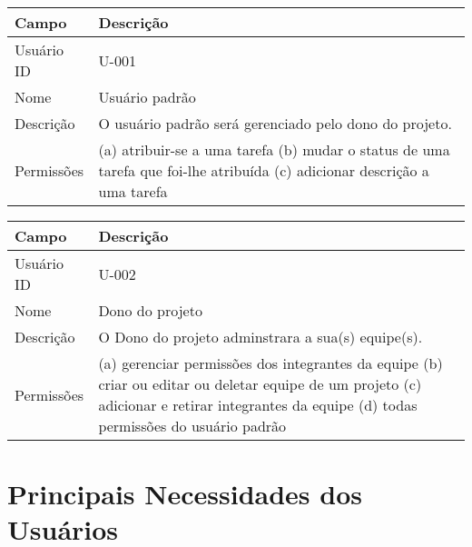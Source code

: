 \begin{table}[htbp]
\begin{tabularx}{\textwidth}{| l | X |}
\hline
Campo             & Descrição                                                                                                                                                                           \\ \hline
Usuário ID    & U-001                                                                                                                                                                              \\ \hline
Nome              & Usuário padrão                                                                                                                                                                       \\ \hline
Descrição         & O usuário padrão será gerenciado pelo dono do projeto.                                                                                                  \\ \hline
Permissões & (a) atribuir-se a uma tarefa (b) mudar o status de uma tarefa que foi-lhe atribuída (c) adicionar descrição a uma tarefa 
\\ \hline
\end{tabularx}
\end{table}



\begin{table}[htbp]
\begin{tabularx}{\textwidth}{| l | X |}
\hline
Campo             & Descrição                                                                                                                                                                           \\ \hline
Usuário ID    & U-002                                                                                                                                                                              \\ \hline
Nome              & Dono do projeto                                                                                                                                                                       \\ \hline
Descrição         & O Dono do projeto adminstrara a sua(s) equipe(s).                                                                                                  \\ \hline
Permissões & (a) gerenciar permissões dos integrantes da equipe (b) criar ou editar ou deletar equipe de um projeto (c) adicionar e retirar integrantes da equipe (d) todas permissões do usuário padrão  \\ \hline

\end{tabularx}
\end{table}   


\section{Principais Necessidades dos Usuários}
